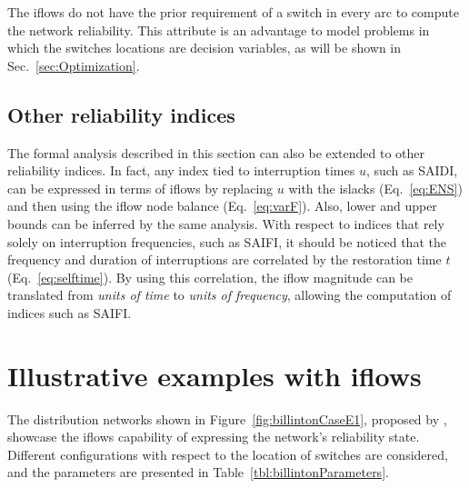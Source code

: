 \documentclass{article}
\begin{document}
The iflows do not have the prior requirement of a switch in every arc to compute the network reliability.  This attribute is an advantage  to model problems in which the switches locations are decision variables, as will be shown in Sec.~\ref{sec:Optimization}.


\subsection{Other reliability indices} \label{ssec:otherIndices}


The formal analysis described in this section can also be extended to other reliability indices. In fact, any index tied to interruption times $u$, such as SAIDI, can be expressed in terms of iflows by replacing $u$ with the islacks (Eq.~\ref{eq:ENS}) and then using the iflow node balance (Eq.~\ref{eq:varF}). Also, lower and upper bounds can be inferred by the same analysis. 
With respect to indices that rely solely on interruption frequencies, such as SAIFI, it should be noticed that the frequency and duration of interruptions are correlated by the restoration time $t$ (Eq.~\ref{eq:selftime}). By using this correlation, the iflow magnitude can be translated from \textit{units of time} to \textit{units of frequency}, allowing the computation of indices such as SAIFI.


\section{Illustrative examples with iflows} \label{sec:Examples}

The distribution networks shown in Figure~\ref{fig:billintonCaseE1}, proposed by \cite{billinton}, showcase the iflows capability of expressing the network's reliability state. 
Different configurations with respect to the location of switches are considered, and the parameters are presented in Table~\ref{tbl:billintonParameters}. 
\end{document}
